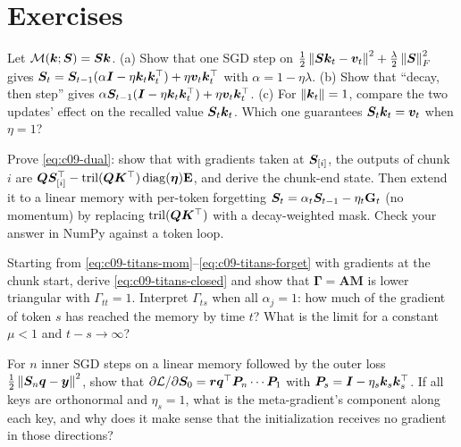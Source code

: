 \section*{Exercises}

\begin{exercise}
Let $\mathcal{M}(\bm{k};\bm{S}) = \bm{S}\bm{k}$. (a) Show that one SGD step on
$\frac12\left\lVert \bm{S}\bm{k}_t-\bm{v}_t\right\rVert^2 + \frac{\lambda}{2}\left\lVert \bm{S}\right\rVert_F^2$ gives
$\bm{S}_t = \bm{S}_{t-1}(\alpha\bm{I} - \eta\bm{k}_t\bm{k}_t^{\top}) + \eta\bm{v}_t\bm{k}_t^{\top}$ with $\alpha = 1-\eta\lambda$.
(b) Show that ``decay, then step'' gives $\alpha\bm{S}_{t-1}(\bm{I} - \eta\bm{k}_t\bm{k}_t^{\top}) +
\eta\bm{v}_t\bm{k}_t^{\top}$. (c) For $\left\lVert \bm{k}_t\right\rVert=1$, compare the two updates' effect on the recalled value
$\bm{S}_t\bm{k}_t$. Which one guarantees $\bm{S}_t\bm{k}_t = \bm{v}_t$ when $\eta = 1$?
\end{exercise}

\begin{exercise}
Prove \eqref{eq:c09-dual}: show that with gradients taken at $\bm{S}_{[i]}$, the outputs of chunk $i$
are $\bm{Q}\bm{S}_{[i]}^{\top} - \operatorname{tril}(\bm{Q}\bm{K}^{\top})\operatorname{diag}(\bm{\eta})\mathbf{E}$, and derive the
chunk-end state. Then extend it to a linear memory with per-token forgetting
$\bm{S}_t = \alpha_t\bm{S}_{t-1} - \eta_t\mathbf{G}_t$ (no momentum) by replacing
$\operatorname{tril}(\bm{Q}\bm{K}^{\top})$ with a decay-weighted mask. Check your answer in NumPy against a
token loop.
\end{exercise}

\begin{exercise}
Starting from \eqref{eq:c09-titans-mom}--\eqref{eq:c09-titans-forget} with gradients at the
chunk start, derive \eqref{eq:c09-titans-closed} and show that $\bm{\Gamma} = \mathbf{A}\mathbf{M}$
is lower triangular with $\Gamma_{tt} = 1$. Interpret $\Gamma_{ts}$ when all $\alpha_j = 1$: how
much of the gradient of token $s$ has reached the memory by time $t$? What is the limit for a
constant $\mu < 1$ and $t - s\to\infty$?
\end{exercise}

\begin{exercise}
For $n$ inner SGD steps on a linear memory followed by the outer loss
$\frac12\left\lVert \bm{S}_n\bm{q}-\bm{y}\right\rVert^2$, show that $\partial\mathcal{L}/\partial\bm{S}_0 =
\bm{r}\bm{q}^{\top}\bm{P}_n\cdots\bm{P}_1$ with $\bm{P}_s = \bm{I} - \eta_s\bm{k}_s\bm{k}_s^{\top}$. If all keys are orthonormal and
$\eta_s = 1$, what is the meta-gradient's component along each key, and why does it make sense that
the initialization receives no gradient in those directions?
\end{exercise}

